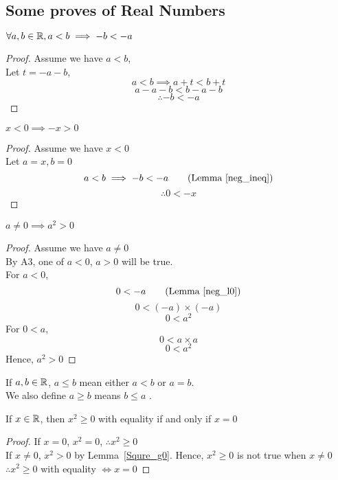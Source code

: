\documentclass[a4paper]{article}
\begin{document}
\subsection{Some proves of Real Numbers}
\begin{nlemma}\label{neg_ineq}
$\forall a, b \in \mathbb{R}, a < b \implies -b < -a$
\end{nlemma}
\begin{proof}
Assume we have $a < b$,\\
Let $t = -a-b$,
\[
a < b \implies a + t < b + t \tag{A1}
\]
\[
a - a - b < b - a - b
\]
\[
\therefore -b < -a
\]
\end{proof}
\begin{nlemma}\label{neg_l0}
$x < 0 \implies -x > 0$
\end{nlemma}
\begin{proof}
Assume we have $x < 0$\\
Let $a = x, b = 0$\\
\[
a < b \implies -b < -a \tag{Lemma~\ref{neg_ineq}}
\]
\[
\therefore 0 < -x
\]
\end{proof}
\begin{nlemma}\label{Squre_g0}
$a \neq 0 \implies a^2 > 0$
\end{nlemma}
\begin{proof}
Assume we have $a \neq 0$\\
By A3, one of $a < 0$, $a > 0$ will be true.\\
For $a < 0$,
\[
	0 < -a \tag{Lemma~\ref{neg_l0}}
\]
\[
	0 < (-a) \times (-a) \tag{A4}
\]
\[
	0 < a^2
\]
For $0 < a$,
\[
	0 < a \times a \tag{A4}
\]
\[
	0 < a ^2
\]
Hence, $a^2 > 0$
\end{proof}

\begin{defi}[$\leq$]
If $a, b \in \mathbb{R}$, $a \leq b$ mean either $a < b$ or $a = b$.\\
We also define $a \geq b$ means $b \leq a$ .
\end{defi}

\begin{ncor}
If $x \in \mathbb{R}$, then $x^2 \geq 0$ with equality if and only if $x = 0$
\end{ncor}
\begin{proof}
If $x = 0$, $x^2 = 0$, $\therefore x^2 \geq 0$\\
If $x \neq 0$, $x^2 > 0$ by Lemma~\ref{Squre_g0}. Hence, $x^2 \geq 0$ is not true when $x \neq 0$\\
$\therefore x^2 \geq 0$ with equality $\iff x = 0$
\end{proof}
\end{document}
